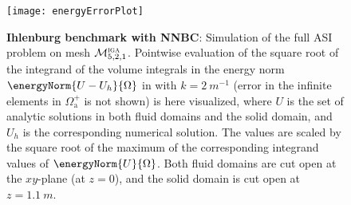 \begin{figure}
	\centering
	\texttt{[image: energyErrorPlot]}
	\caption{\textbf{Ihlenburg benchmark with NNBC}: Simulation of the full ASI problem on mesh ${\cal M}_{5,2,1}^{\textsc{iga}}$. Pointwise evaluation of the square root of the integrand of the volume integrals in the energy norm $\energyNorm{U-U_h}{\Omega}$ in  with $k=\SI{2}{m^{-1}}$ (error in the infinite elements in $\Omega_{\mathrm{a}}^+$ is not shown) is here visualized, where $U$ is the set of analytic solutions in both fluid domains and the solid domain, and $U_h$ is the corresponding numerical solution. The values are scaled by the square root of the maximum of the corresponding integrand values of $\energyNorm{U}{\Omega}$. Both fluid domains are cut open at the $xy$-plane (at $z=0$), and the solid domain is cut open at $z=\SI{1.1}{m}$.}
	\label{Fig2:energyErrorPlot}
\end{figure}

